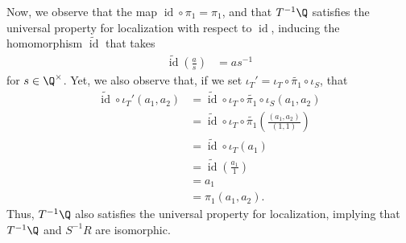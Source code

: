 \documentclass[10pt]{mypackage}
\begin{document}
\begin{solution}
\begin{enumerate}[(a)]
      Now, we observe that the map $\operatorname{id}\circ \pi_1 = \pi_1$, and that $ T^{-1}\Q $ satisfies the universal property for localization with respect to $ \operatorname{id} $, inducing the homomorphism $ \widetilde{\operatorname{id}} $ that takes
      \begin{align*}
        \widetilde{\operatorname{id}} \left( \frac{a}{s} \right) &= as^{-1}
      \end{align*}
      for $s\in \Q^{\times}$. Yet, we also observe that, if we set $\iota_{T}' = \iota_{T}\circ \widetilde{\pi_1}\circ \iota_S$, that
      \begin{align*}
        \widetilde{\operatorname{id}}\circ \iota_{T}'\left( a_1,a_2 \right) &= \widetilde{\operatorname{id}}\circ \iota_{T}\circ \widetilde{\pi_1}\circ \iota_S \left( a_1,a_2 \right)\\
                                                                            &= \widetilde{\operatorname{id}}\circ \iota_T \circ \widetilde{\pi_1} \left( \frac{\left( a_1,a_2 \right)}{\left( 1,1 \right)} \right)\\
                                                                                                                &= \widetilde{\operatorname{id}}\circ \iota_{T}\left( a_1 \right)\\
                                                                                                                &= \widetilde{\operatorname{id}}\left( \frac{a_1}{1} \right)\\
                                                                                                                &= a_1\\
                                                                                                                &= \pi_1\left( a_1,a_2 \right).
      \end{align*}
      Thus, $T^{-1}\Q$ also satisfies the universal property for localization, implying that $T^{-1}\Q$ and $S^{-1}R$ are isomorphic.
      \begin{center}

\end{center}
\end{enumerate}
\end{solution}
\end{document}
